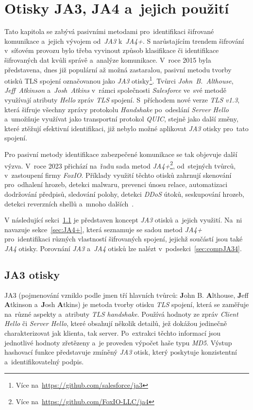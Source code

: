 \chapter{Otisky JA3, JA4 a~jejich použití}
\label{chp:JA34}
Tato kapitola se zabývá pasivními metodami pro~identifikaci šifrované komunikace a~jejich vývojem od~\textit{JA3} k~\textit{JA4+}. 
S narůstajícím trendem šifrování v~síťovém provozu bylo třeba vyvinout způsob klasifikace či identifikace šifrovaných dat kvůli správě a~analýze komunikace. V~roce 2015 byla představena, dnes již populární až možná zastaralou, pasivní metodu tvorby otisků TLS spojení označovanou jako \textit{JA3} otisky\footnote{Více na~\url{https://github.com/salesforce/ja3}}. Tvůrci \textit{John~B.~Althouse}, \textit{Jeff~Atkinson} a~\textit{Josh~Atkins} v~rámci společnosti \textit{Salesforce} ve~své metodě využívají atributy \textit{Hello} zpráv \textit{TLS} spojení. S~příchodem nové verze \textit{TLS v1.3}, která šifruje všechny zprávy protokolu \textit{Handshake} po~odeslání \textit{Server Hello} a~umožňuje využívat jako transportní protokol \textit{QUIC}, stejně jako další změny, které ztěžují efektivní identifikaci, již nebylo možné aplikovat \textit{JA3} otisky pro~tato spojení.

Pro pasivní metody identifikace zabezpečené komunikace se tak objevuje další výzva. V~roce 2023 přichází na~řadu sada metod \textit{JA4+}\footnote{Více na~\url{https://github.com/FoxIO-LLC/ja4}}, od~stejných tvůrců, v~zastoupení firmy \textit{FoxIO}. Příklady využití těchto otisků zahrnují skenování pro~odhalení hrozeb, detekci malwaru, prevenci únosu relace, automatizaci dodržování předpisů, sledování polohy, detekci \textit{DDoS} útoků, seskupování hrozeb, detekci reverzních shellů a~mnoho dalších~\cite{Althouse2023}.

V následující sekci~\ref{sec:JA3} je představen koncept \textit{JA3} otisků a~jejich využití. Na~ni navazuje sekce~\ref{sec:JA4+}, která seznamuje se sadou metod \textit{JA4+} pro~identifikaci různých vlastností šifrovaných spojení, jejichž součástí jsou také \textit{JA4} otisky. Porovnání \textit{JA3} a~\textit{JA4} otisků lze nalézt v~podsekci~\ref{sec:compJA34}.

\section{JA3 otisky}
\label{sec:JA3}
JA3 (pojmenování vzniklo podle jmen tří hlavních tvůrců: \textbf{J}ohn B. \textbf{A}lthouse, \textbf{J}eff \textbf{A}tkinson a~\textbf{J}osh \textbf{A}tkins) je metoda tvorby otisku \textit{TLS} spojení, která se zaměřuje na~různé aspekty a~atributy \textit{TLS handshake}. Používá hodnoty ze zpráv \textit{Client Hello} či \textit{Server Hello}, které obsahují několik detailů, jež dokážou jedinečně charakterizovat jak klienta, tak server. Po~extrakci těchto informací jsou jednotlivé hodnoty zřetězeny a~je proveden výpočet haše typu \textit{MD5}. Výstup hashovací funkce představuje zmíněný \textit{JA3} otisk, který poskytuje konzistentní a~identifikovatelný podpis.


